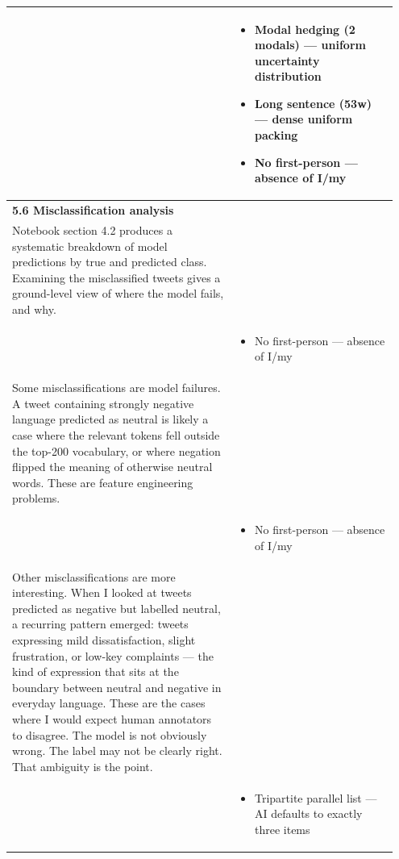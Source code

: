 \documentclass[11pt]{article}
\begin{document}
\begin{longtable}{|p{0.55\linewidth}|p{0.40\linewidth}|}
\hline
\rule[-3.5cm]{0pt}{3.5cm} & \begin{itemize}[leftmargin=1em,itemsep=1pt,topsep=1pt,parsep=0pt]
  \item Modal hedging (2 modals) --- uniform uncertainty distribution
  \item Long sentence (53w) --- dense uniform packing
  \item No first-person --- absence of I/my
\end{itemize} \\
\hline
\textbf{5.6 Misclassification analysis}\\[4pt]
Notebook section 4.2 produces a systematic breakdown of model predictions by true and predicted class. Examining the misclassified tweets gives a ground-level view of where the model fails, and why. & \\[2pt]
\hline
\rule[-3.5cm]{0pt}{3.5cm} & \begin{itemize}[leftmargin=1em,itemsep=1pt,topsep=1pt,parsep=0pt]
  \item No first-person --- absence of I/my
\end{itemize} \\
\hline
Some misclassifications are model failures. A tweet containing strongly negative language predicted as neutral is likely a case where the relevant tokens fell outside the top-200 vocabulary, or where negation flipped the meaning of otherwise neutral words. These are feature engineering problems. & \\[2pt]
\hline
\rule[-3.5cm]{0pt}{3.5cm} & \begin{itemize}[leftmargin=1em,itemsep=1pt,topsep=1pt,parsep=0pt]
  \item No first-person --- absence of I/my
\end{itemize} \\
\hline
Other misclassifications are more interesting. When I looked at tweets predicted as negative but labelled neutral, a recurring pattern emerged: tweets expressing mild dissatisfaction, slight frustration, or low-key complaints --- the kind of expression that sits at the boundary between neutral and negative in everyday language. These are the cases where I would expect human annotators to disagree. The model is not obviously wrong. The label may not be clearly right. That ambiguity is the point. & \\[2pt]
\hline
\rule[-3.5cm]{0pt}{3.5cm} & \begin{itemize}[leftmargin=1em,itemsep=1pt,topsep=1pt,parsep=0pt]
  \item Tripartite parallel list --- AI defaults to exactly three items

\end{itemize}
\end{longtable}
\end{document}
